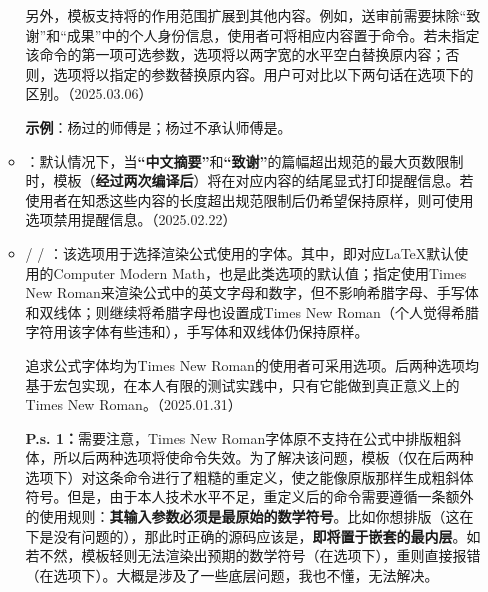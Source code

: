 \documentclass[doctor, vlined]{DissertUESTC}
\begin{document}
\begin{itemize}
\begin{itemize}
			另外，模板支持将的作用范围扩展到其他内容。例如，送审前需要抹除“致谢”和“成果”中的个人身份信息，使用者可将相应内容置于命令。若未指定该命令的第一项可选参数，选项将以两字宽的水平空白替换原内容；否则，选项将以指定的参数替换原内容。用户可对比以下两句话在选项下的区别。（2025.03.06）

			\textbf{示例}：杨过的师傅是；杨过不承认师傅是。
			
			\item {}：默认情况下，当\textbf{“中文摘要”}和\textbf{“致谢”}的篇幅超出规范的最大页数限制时，模板（\textbf{经过两次编译后}）将在对应内容的结尾显式打印提醒信息。若使用者在知悉这些内容的长度超出规范限制后仍希望保持原样，则可使用选项禁用提醒信息。（2025.02.22）
			
			\item {} /  / ：该选项用于选择渲染公式使用的字体。其中，即对应LaTeX默认使用的Computer Modern Math，也是此类选项的默认值；指定使用Times New Roman来渲染公式中的英文字母和数字，但不影响希腊字母、手写体和双线体；则继续将希腊字母也设置成Times New Roman（个人觉得希腊字符用该字体有些违和），手写体和双线体仍保持原样。
			
			追求公式字体均为Times New Roman的使用者可采用选项。后两种选项均基于\href{https://mirrors.pku.edu.cn/ctan/macros/xetex/latex/mathspec/mathspec.pdf}{\ttfamily\color{DarkRed}}宏包实现，在本人有限的测试实践中，只有它能做到真正意义上的Times New Roman。（2025.01.31）
			
			\textbf{P.s. 1：}需要注意，Times New Roman字体原不支持在公式中排版粗斜体，所以后两种选项将使命令失效。为了解决该问题，模板（仅在后两种选项下）对这条命令进行了粗糙的重定义，使之能像原版那样生成粗斜体符号。但是，由于本人技术水平不足，重定义后的命令需要遵循一条额外的使用规则：\textbf{其输入参数必须是最原始的数学符号}。比如你想排版（这在下是没有问题的），那此时正确的源码应该是，\textbf{即将置于嵌套的最内层}。如若不然，模板轻则无法渲染出预期的数学符号（在选项下），重则直接报错（在选项下）。大概是涉及了一些底层问题，我也不懂，无法解决。


\end{itemize}
\end{itemize}
\end{document}
